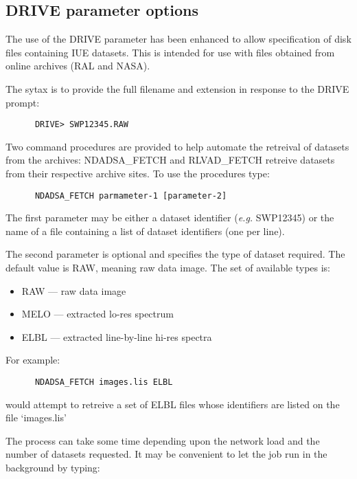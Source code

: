 \subsection{DRIVE parameter options}

The use of the DRIVE parameter has been enhanced to allow
specification of disk files containing IUE datasets. This is intended
for use with  files obtained from online archives (RAL and NASA).

The sytax is to provide the full filename and extension in response to 
the DRIVE prompt:

\begin{verbatim}
      DRIVE> SWP12345.RAW
\end{verbatim}

Two command procedures are provided to help automate the retreival of
datasets from the archives: NDADSA\_FETCH and RLVAD\_FETCH retreive
datasets from their respective archive sites. To use the procedures
type:

\begin{verbatim}
      NDADSA_FETCH parmameter-1 [parameter-2]
\end{verbatim}

The first parameter may be either a dataset  identifier ({\em e.g.}
SWP12345) or the name of a file containing a list of dataset
identifiers (one per line).

The second parameter is optional and specifies the type of dataset
required. The default value is RAW, meaning raw data image. The set of
available types is:

\begin{itemize}
\item RAW --- raw data image
\item MELO --- extracted lo-res spectrum
\item ELBL --- extracted line-by-line hi-res spectra
\end{itemize}

For example:

\begin{verbatim}
      NDADSA_FETCH images.lis ELBL
\end{verbatim}

would attempt to retreive a set of ELBL files whose identifiers are
listed on the file `images.lis'

The process can take some time depending upon the network load and the
number of datasets requested. It may be convenient to let the job run
in the background by typing:

